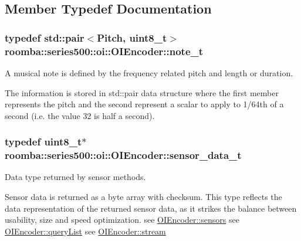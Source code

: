 \subsection{Member Typedef Documentation}
\hypertarget{classroomba_1_1series500_1_1oi_1_1_o_i_encoder_ab4b7bf89bb873d838512791e339694fd}{
\subsubsection[{note\+\_\+t}]{\setlength{\rightskip}{0pt plus 5cm}typedef std\+::pair$<${\bf Pitch}, uint8\+\_\+t$>$ {\bf roomba\+::series500\+::oi\+::\+O\+I\+Encoder\+::note\+\_\+t}}}\label{classroomba_1_1series500_1_1oi_1_1_o_i_encoder_ab4b7bf89bb873d838512791e339694fd}


A musical note is defined by the frequency related pitch and length or duration. 

The information is stored in std\+::pair data structure where the first member represents the pitch and the second represent a scalar to apply to 1/64th of a second (i.\+e. the value 32 is half a second). \hypertarget{classroomba_1_1series500_1_1oi_1_1_o_i_encoder_a19ddaf411fb6201dde68dd359932992b}{
\subsubsection[{sensor\+\_\+data\+\_\+t}]{\setlength{\rightskip}{0pt plus 5cm}typedef uint8\+\_\+t$\ast$ {\bf roomba\+::series500\+::oi\+::\+O\+I\+Encoder\+::sensor\+\_\+data\+\_\+t}}}\label{classroomba_1_1series500_1_1oi_1_1_o_i_encoder_a19ddaf411fb6201dde68dd359932992b}


Data type returned by sensor methods. 

Sensor data is returned as a byte array with checksum. This type reflects the data representation of the returned sensor data, as it strikes the balance between usability, size and speed optimization. see \hyperlink{classroomba_1_1series500_1_1oi_1_1_o_i_encoder_a84fbcbb2bca5e68e163c7df0e0cfae7b}{O\+I\+Encoder\+::sensors} see \hyperlink{classroomba_1_1series500_1_1oi_1_1_o_i_encoder_a05c85b8943ee3c596c814c24fd5a9607}{O\+I\+Encoder\+::query\+List} see \hyperlink{classroomba_1_1series500_1_1oi_1_1_o_i_encoder_ab771291acce95812bd1b41ff2b674baf}{O\+I\+Encoder\+::stream} 


